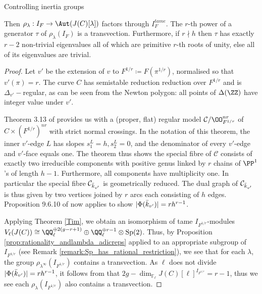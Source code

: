 \documentclass[11pt,a4paper]{article}
\newcommand{\Fl}{\mathbb{F}_\ell}
\newcommand{\DZ}{\Delta(\ZZ)}
\begin{document}
\begin{section}{Controlling inertia groups}
\begin{proposition}
\begin{center}
\end{center}
Then $\rho_\lambda : I_F \rightarrow \Aut(J(C)[\lambda])$ factors through $I_F^{tame}$. The $r$-th power of a generator $\tau$ of $\rho_\lambda (I_F)$ is a transvection.
Furthermore, if $r \nmid h$ then $\tau$ has exactly $r-2$ non-trivial eigenvalues all of which are primitive $r$-th roots of unity, else all of its eigenvalues are trivial.
\end{proposition}

\begin{proof}
 Let $v'$ be the extension of $v$ to $F^{1/r}\coloneqq F({\pi^{1/r}})$, normalised so that $v'(\pi)= r$.
 The curve $C$ has semistable reduction reduction over $F^{1/r}$ and is $\Delta_{v'}-$regular, as can be seen from the Newton polygon: all points of $\DZ$ have integer value under $v'$.
 
 
 Theorem 3.13 of \cite{Models_Curves_DVR} provides us with a (proper, flat) regular model $\mathcal{C}/\OO^{nr}_{F^{1/r}}$ of $C \times (F^{1/r})^{nr}$ with strict normal crossings.
In the notation of this theorem, the inner $v'$-edge $L$ has slopes $s_1^L=h, s_2^L=0$, and the denominator of every $v'$-edge and $v'$-face equals one.
The theorem thus shows the special fibre of $\mathcal{C}$ consists of exactly two irreducible components with positive genus linked by $r$ chains of $\PP^1$'s of length $h-1$. Furthermore, all components have multiplicity one. In particular the special fibre $\mathcal{C}_{\Bar{k}_{v'}}$ is geometrically reduced.
The dual graph of $\mathcal{C}_{\Bar{k}_{v'}}$ is thus given by two vertices joined by $r$ arcs each consisting of $h$ edges. Proposition 9.6.10 of \cite{Neron_models_BLR_book} now applies to show $|\Phi(\Bar{k}_{v'})| = rh^{r-1}$.



Applying Theorem \ref{Tim}, we obtain an isomorphism of tame $I_{F^{1/r}}$-modules $V_\ell(J(C)) \cong \QQ_\ell^{\oplus 2(g-r+1)} \oplus \QQ_\ell^{\oplus r-1} \otimes \mathrm{Sp}(2)$.
Thus, by Proposition \ref{prop:rationality_andlambda_adicreps} applied to an appropriate subgroup of $I_{F^{1/r}}$ (see Remark \ref{remark:Sp_has_rational_restriction}), we see that for each $\lambda$, the group $\rho_{\lambda^\infty}(I_{F^{1/r}})$ contains a transvection.
As $\ell$ does not divide $|\Phi(\Bar{k}_{v'})| = rh^{r-1}$, it follows from \cite[Lemmas 1 \& 2]{Serre_Tate} that ${2g - \dim_{\Fl}J(C)[\ell]^{I_{F^{1/r}}}} = r-1$, thus we see each $\rho_{\lambda}(I_{F^{1/r}})$ also contains a transvection.



\end{proof}
\end{section}
\end{document}
